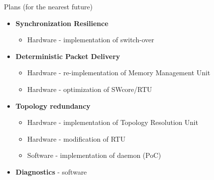 \documentclass[compress,red]{beamer}
\begin{document}
\begin{frame}{Plans (for the nearest future)}

  \begin{itemize}
    \item {\bf Synchronization Resilience}
    \begin{itemize}
      \item Hardware - implementation of switch-over
    \end{itemize}    
    \item {\bf Deterministic Packet Delivery}
    \begin{itemize}
      \item Hardware - re-implementation of Memory Management Unit
      \item Hardware - optimization of SWcore/RTU 
    \end{itemize}    
    \item {\bf Topology redundancy}
    \begin{itemize}
      \item Hardware - implementation of Topology Resolution Unit
      \item Hardware - modification of RTU 
      \item Software - implementation of daemon (PoC)
    \end{itemize}  
    \item {\bf Diagnostics} - software
  \end{itemize}
\end{frame}
\section{}
\end{document}
